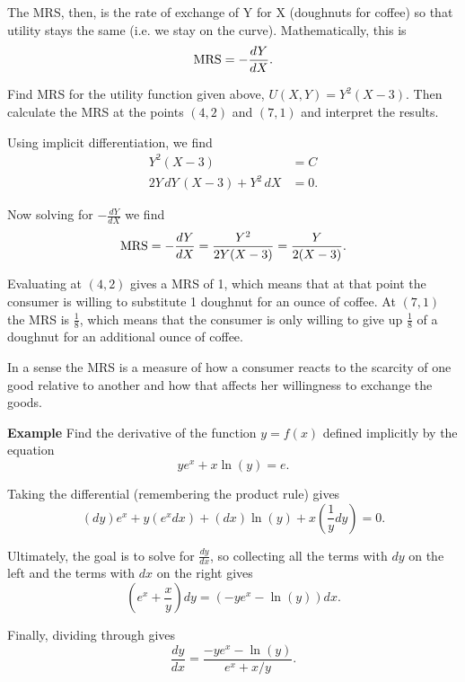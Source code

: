 \documentclass[twoside,openright,titlepage,a4paper]{book}
\begin{document}
\begin{sloppypar}
The MRS, then, is the rate of exchange of Y for X (doughnuts for coffee) so that utility stays the same (i.e. we stay on the curve). Mathematically, this is \[ \hbox{MRS} = -\frac{dY}{dX}. \]

Find MRS for the utility function given above, $U(X,Y) = Y^2(X-3)$. Then calculate the MRS at the points $(4,2)$ and $(7,1)$ and interpret the results.
	
\begin{examplebox}
Using implicit differentiation, we find
\begin{align*}
Y^2(X-3) &= C \\
2Y\, dY \,(X-3) + Y^2 \, dX &= 0.
\end{align*}

Now solving for $-\frac{dY}{dX}$ we find \[ \hbox{MRS} = -\frac{dY}{dX} = \frac{Y^2}{2Y(X-3)} = \frac{Y}{2(X-3)}. \]

Evaluating at $(4,2)$ gives a MRS of 1, which means that at that point the consumer is willing to substitute 1 doughnut for an ounce of coffee. At $(7,1)$ the MRS is $\frac{1}{8}$, which means that the consumer is only willing to give up $\frac{1}{8}$ of a doughnut for an additional ounce of coffee.

In a sense the MRS is a measure of how a consumer reacts to the scarcity of one good relative to another and how that affects her willingness to exchange the goods.	
\end{examplebox}

\bigbreak
\textbf{Example} Find the derivative of the function $y=f(x)$ defined implicitly by the equation
\begin{equation*}
ye^x+x\ln(y) = e.
\end{equation*}
\begin{examplebox}
Taking the differential (remembering the product rule) gives
\begin{equation*}
(dy)e^x+y(e^xdx)+(dx)\ln(y) + x\left(\frac{1}{y}dy\right)= 0.
\end{equation*}

Ultimately, the goal is to solve for $\frac{dy}{dx}$, so collecting all the terms with $dy$ on the left and the terms with $dx$ on the right gives
\begin{equation*}
\left(e^x+\frac{x}{y}\right)dy = \left(-ye^x-\ln(y)\right)dx.
\end{equation*}

Finally, dividing through gives
\begin{equation*}
\frac{dy}{dx} = \frac{-ye^x-\ln(y)}{e^x+x/y}. 
\end{equation*}
\end{examplebox}
	

\end{sloppypar}
\end{document}
